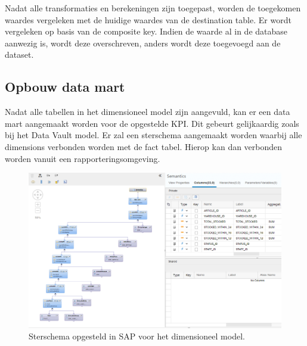 Nadat alle transformaties en berekeningen zijn toegepast, worden de toegekomen waardes vergeleken met de huidige waardes van de destination table. Er wordt vergeleken op basis van de composite key. Indien de waarde al in de database aanwezig is, wordt deze overschreven, anders wordt deze toegevoegd aan de dataset.

\subsection{Opbouw data mart}
Nadat alle tabellen in het dimensioneel model zijn aangevuld, kan er een data mart aangemaakt worden voor de opgestelde KPI. Dit gebeurt gelijkaardig zoals bij het Data Vault model. Er zal een sterschema aangemaakt worden waarbij alle dimensions verbonden worden met de fact tabel. Hierop kan dan verbonden worden vanuit een rapporteringsomgeving. 

\begin{figure}[h]
	\centering
	\includegraphics[scale=0.5]{../images/DM_FG_datamart.png}
	\caption{Sterschema opgesteld in SAP voor het dimensioneel model.}
	\label{fig:dmdmart}
\end{figure}


